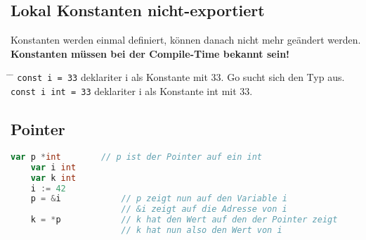 \documentclass[twoside,a4paper,12pt]{article}
\begin{document}
\subsection{Lokal Konstanten nicht-exportiert}
Konstanten werden einmal definiert, können danach nicht mehr geändert werden. \\ 
\textbf{Konstanten müssen bei der Compile-Time bekannt sein!}
\begin{tabbing}
 \hspace{2mm} \= \hspace{50mm} \= \kill
 \> \verb|const i = 33| \> deklariter i als Konstante mit 33. Go sucht sich den Typ aus. \\ 
 \> \verb|const i int = 33| \>deklariter i als Konstante int mit 33. \\ 
\end{tabbing}

\subsection{Pointer}
\begin{center}
  \begin{minipage}{1.0\textwidth}
    \begin{lstlisting}[language=Go]
    var p *int        // p ist der Pointer auf ein int  
    var i int 
    var k int
    i := 42 
    p = &i            // p zeigt nun auf den Variable i 
                      // &i zeigt auf die Adresse von i
    k = *p            // k hat den Wert auf den der Pointer zeigt
                      // k hat nun also den Wert von i
    \end{lstlisting}
  \end{minipage}
\end{center}
\end{document}
